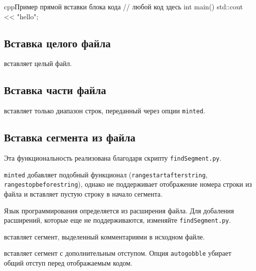 \documentclass[a4paper,12pt]{report}
\begin{document}
\begin{code}{cpp}{Пример прямой вставки блока кода}
// любой код здесь
int main()
{
    std::cout << "hello";
}
\end{code}

\subsection{Вставка целого файла}

 вставляет целый файл.


\subsection{Вставка части файла}

 вставляет только диапазон строк, переданный через опции \verb|minted|.


\subsection{Вставка сегмента из файла}

Эта функциональность реализована благодаря скрипту \texttt{findSegment.py}.

\verb|minted| добавляет подобный функционал (\verb|rangestartafterstring|, \verb|rangestopbeforestring|),
однако не поддерживает отображение номера строки из файла и вставляет пустую строку в начало сегмента.

Язык программирования определяется из расширения файла. 
Для добаления расширений, которые еще не поддерживаются, изменяйте \texttt{findSegment.py}.

 вставляет сегмент, выделенный комментариями в исходном файле.


 вставляет сегмент с дополнительным отступом.
Опция \verb|autogobble| убирает общий отступ перед отображаемым кодом.

\end{document}
